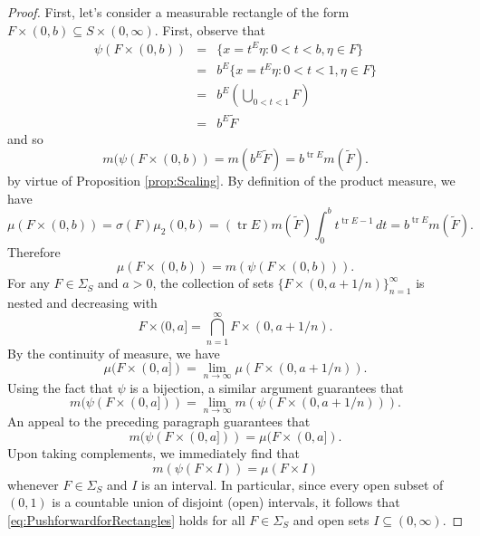 \documentclass[11pt]{article}
\theoremstyle{theorem}
\newcommand\tr{\operatorname{tr}}
\begin{document}
\begin{proof}
First, let's consider a measurable rectangle of the form $F\times (0,b)\subseteq S\times (0,\infty)$. First, observe that
\begin{eqnarray*}
\psi(F\times (0,b))&=&\{x=t^E \eta:0<t<b,\eta\in F\}\\
&=&b^{E}\{x=t^E\eta:0<t<1,\eta\in F\}\\
&=&b^{E}\left(\bigcup_{0<t<1} F\right)\\
&=&b^E\tilde F
\end{eqnarray*}
 and so
\begin{equation*}
m(\psi(F\times (0,b))=m(b^E\tilde F)=b^{\tr E}m(\tilde F).
\end{equation*}
by virtue of Proposition \ref{prop:Scaling}. By definition of the product measure, we have
\begin{equation*}
\mu(F\times (0,b))=\sigma(F)\mu_2(0,b)=(\tr E)m(\tilde F)\int_0^bt^{\tr E-1}\,dt=b^{\tr E}m(\tilde F).
\end{equation*}
Therefore
\begin{equation*}
\mu(F\times (0,b))=m(\psi(F\times (0,b))).
\end{equation*}
For any $F\in \Sigma_S$ and $a>0$, the collection of sets $\{F\times (0,a+1/n)\}_{n=1}^\infty$ is nested and decreasing with 
\begin{equation*}
F\times (0,a]=\bigcap_{n=1}^\infty F\times (0,a+1/n).
\end{equation*}
By the continuity of measure, we have
\begin{equation*}
\mu(F\times (0,a])=\lim_{n\to \infty}\mu(F\times (0,a+1/n)).
\end{equation*}
Using the fact that $\psi$ is a bijection, a similar argument guarantees that
\begin{equation*}
m(\psi(F\times (0,a]))=\lim_{n\to\infty}m(\psi(F\times (0,a+1/n))).
\end{equation*}
An appeal to the preceding paragraph guarantees that
\begin{equation*}
m(\psi(F\times (0,a]))=\mu(F\times (0,a]).
\end{equation*}
Upon taking complements, we immediately find that 
\begin{equation}\label{eq:PushforwardforRectangles}
m(\psi(F\times I))=\mu(F\times I)
\end{equation}
whenever $F\in \Sigma_S$ and $I$ is an interval. In particular, since every open subset of $(0,1)$ is a countable union of disjoint (open) intervals, it follows that \eqref{eq:PushforwardforRectangles} holds for all $F\in\Sigma_S$ and open sets $I\subseteq (0,\infty)$. 


\end{proof}
\end{document}
